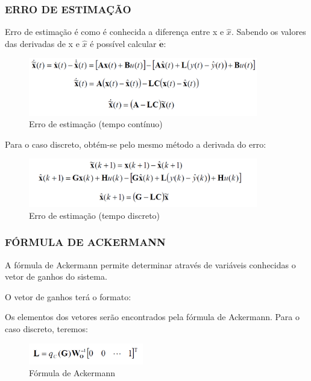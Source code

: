 \documentclass[a4paper,12pt]{article}
\begin{document}
\subsubsection{ERRO DE ESTIMAÇÃO}
Erro de estimação é como é conhecida a diferença entre x e $\hat{x}$. Sabendo os valores das derivadas de x e $\hat{x}$ é possível calcular $\dot{\mathbf{e}}$:


\begin{figure}[!h]
\centering
\includegraphics[width=10cm]{fotosLab5/erro_continuo.png}
\caption{Erro de estimação (tempo contínuo)}
\label{erro_continuo}
\end{figure}

Para o caso discreto, obtém-se pelo mesmo método a derivada do erro:

\begin{figure}[!h]
\centering
\includegraphics[width=10cm]{fotosLab5/erro_discreto.png}
\caption{Erro de estimação (tempo discreto)}
\label{erro_discreto}
\end{figure}

\subsubsection{FÓRMULA DE ACKERMANN}

\hspace{4ex}A fórmula de Ackermann permite determinar através de variáveis conhecidas o vetor de ganhos do sistema.

O vetor de ganhos terá o formato:

\hspace{4ex}{\bf L=[L1,L2,…,Ln]}

Os elementos dos vetores serão encontrados pela fórmula de Ackermann. Para o caso discreto, teremos:

\begin{figure}[!h]
\centering
\includegraphics[width=5cm]{fotosLab5/ackermann.png}
\caption{Fórmula de Ackermann}
\label{ackermann}
\end{figure}
\end{document}
